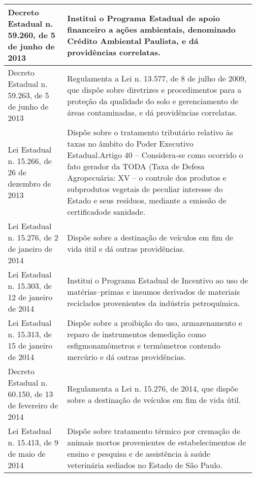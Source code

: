 \begin{center}
\begin{longtable}{|p{}|p{}|}
			\hline
			Decreto Estadual n. 59.260, de 5 de junho de 2013 & Institui   o   Programa   Estadual   de   apoio   financeiro   a   ações   ambientais, denominado Crédito Ambiental Paulista, e dá providências correlatas. \\
			\hline
			Decreto Estadual n. 59.263, de 5 de junho de 2013 & Regulamenta a Lei n. 13.577, de 8 de julho de 2009, que dispõe sobre diretrizes e  procedimentos  para  a  proteção  da  qualidade  do  solo  e  gerenciamento  de áreas contaminadas, e dá providências correlatas. \\
			\hline
			Lei  Estadual  n.  15.266,  de  26 de dezembro de 2013 & Dispõe  sobre  o  tratamento  tributário  relativo  às  taxas  no  âmbito  do  Poder Executivo Estadual.\newline{}Artigo  40  –  Considera-se  como  ocorrido  o  fato  gerador  da  TODA  (Taxa  de Defesa Agropecuária: XV – o controle dos produtos e subprodutos vegetais de peculiar interesse do Estado e seus resíduos, mediante a emissão de certificado\newline{}de sanidade. \\
			\hline
			Lei Estadual n. 15.276, de 2 de janeiro de 2014 & Dispõe  sobre  a  destinação  de  veículos  em  fim  de  vida  útil  e  dá  outras providências. \\
			\hline
			Lei  Estadual  n.  15.303,  de  12 de janeiro de 2014 & Institui o Programa Estadual de Incentivo ao uso de matérias–primas e insumos derivados de materiais reciclados provenientes da indústria petroquímica. \\
			\hline
			Lei  Estadual  n.  15.313,  de  15 de janeiro de 2014 & Dispõe sobre a proibição do uso, armazenamento e reparo de instrumentos de\newline{}medição  como  esfigmonamômetros  e  termômetros  contendo  mercúrio  e  dá outras providências. \\
			\hline
			Decreto Estadual n. 60.150, de 13 de fevereiro de 2014 & Regulamenta  a  Lei  n.  15.276,  de  2014,  que  dispõe  sobre  a  destinação  de veículos em fim de vida útil. \\
			\hline
			Lei Estadual n. 15.413, de 9 de maio de 2014 & Dispõe sobre tratamento térmico por cremação de animais mortos provenientes de estabelecimentos de ensino e pesquisa e de assistência à saúde veterinária sediados no Estado de São Paulo. \\
			\hline

\end{longtable}
\end{center}
